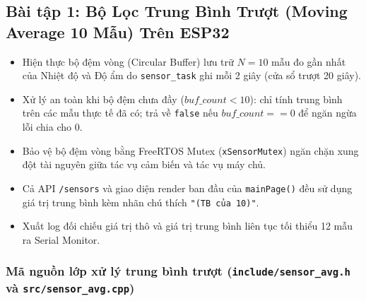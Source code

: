 \newpage
\subsection{Bài tập 1: Bộ Lọc Trung Bình Trượt (Moving Average 10 Mẫu) Trên ESP32}

\begin{tcolorbox}[
    enhanced, colback=black!2, colframe=black!60, boxrule=1pt, arc=2.5mm, drop shadow,
    attach boxed title to top left={xshift=4mm, yshift=-3mm},
    boxed title style={enhanced, colback=black!85, colframe=black!85, boxrule=1pt, arc=2.5mm, drop shadow, left=6pt, right=6pt, top=2pt, bottom=2pt},
    title=\textcolor{white}{\large\textbf{Yêu cầu kỹ thuật Bài tập 1}}
]
\bfseries
\vspace{0.2cm}
\begin{itemize}
    \item Hiện thực bộ đệm vòng (Circular Buffer) lưu trữ $N=10$ mẫu đo gần nhất của Nhiệt độ và Độ ẩm do \texttt{sensor\_task} ghi mỗi 2 giây (cửa sổ trượt 20 giây).
    \item Xử lý an toàn khi bộ đệm chưa đầy ($buf\_count < 10$): chỉ tính trung bình trên các mẫu thực tế đã có; trả về \texttt{false} nếu $buf\_count == 0$ để ngăn ngừa lỗi chia cho 0.
    \item Bảo vệ bộ đệm vòng bằng FreeRTOS Mutex (\texttt{xSensorMutex}) ngăn chặn xung đột tài nguyên giữa tác vụ cảm biến và tác vụ máy chủ.
    \item Cả API \texttt{/sensors} và giao diện render ban đầu của \texttt{mainPage()} đều sử dụng giá trị trung bình kèm nhãn chú thích \texttt{"(TB của 10)"}.
    \item Xuất log đối chiếu giá trị thô và giá trị trung bình liên tục tối thiểu 12 mẫu ra Serial Monitor.
\end{itemize}
\end{tcolorbox}

\subsubsection{Mã nguồn lớp xử lý trung bình trượt (\texttt{include/sensor\_avg.h} và \texttt{src/sensor\_avg.cpp})}

